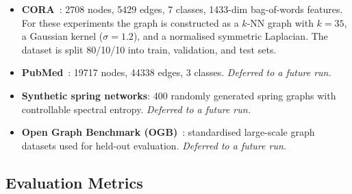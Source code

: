 \documentclass[11pt,a4paper]{article}
\begin{document}
\begin{itemize}
  \item \textbf{CORA}~\cite{kipf2016}: 2708 nodes, 5429 edges, 7 classes,
        1433-dim bag-of-words features.  For these experiments the graph is
        constructed as a $k$-NN graph with $k=35$, a Gaussian kernel
        ($\sigma=1.2$), and a normalised symmetric Laplacian.
        The dataset is split 80/10/10 into train, validation, and test sets.
  \item \textbf{PubMed}~\cite{kipf2016}: 19717 nodes, 44338 edges, 3 classes.
        \emph{Deferred to a future run.}
  \item \textbf{Synthetic spring networks}: 400 randomly generated spring
        graphs with controllable spectral entropy.
        \emph{Deferred to a future run.}
  \item \textbf{Open Graph Benchmark (OGB)}~\cite{hu2020}: standardised
        large-scale graph datasets used for held-out evaluation.
        \emph{Deferred to a future run.}
\end{itemize}

\subsection{Evaluation Metrics}
\label{sec:experiments:metrics}
\end{document}
